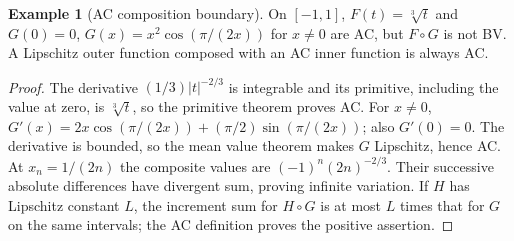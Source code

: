 \documentclass[11pt,oneside,openany]{book}
\theoremstyle{definition}
\newtheorem{example}[theorem]{Example}
\theoremstyle{remark}
\newcommand{\family}[1]{}
\begin{document}
\begin{example}[AC composition boundary]\family{D11.12.ac_composition_boundary}\label{d11:12:ac-composition-boundary}
On $[-1,1]$, $F(t)=\sqrt[3]t$ and
$G(0)=0$, $G(x)=x^2\cos(\pi/(2x))$ for $x\ne0$ are AC, but
$F\circ G$ is not BV. A Lipschitz outer function composed with an AC
inner function is always AC.
\end{example}
\begin{proof}
The derivative $(1/3)|t|^{-2/3}$ is integrable and its primitive, including
the value at zero, is $\sqrt[3]t$, so the primitive theorem proves AC.
For $x\ne0$, $G'(x)=2x\cos(\pi/(2x))+(\pi/2)\sin(\pi/(2x))$;
also $G'(0)=0$. The derivative is bounded, so the mean value theorem
makes $G$ Lipschitz, hence AC. At $x_n=1/(2n)$ the composite values are
$(-1)^n(2n)^{-2/3}$. Their successive absolute differences have divergent
sum, proving infinite variation. If $H$ has Lipschitz constant $L$, the
increment sum for $H\circ G$ is at most $L$ times that for $G$ on the
same intervals; the AC definition proves the positive assertion.
\end{proof}
\end{document}
